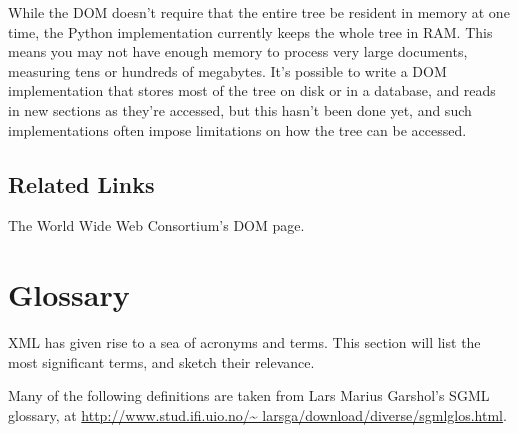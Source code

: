 \documentclass{howto}
\begin{document}
While the DOM doesn't require that the entire tree be resident in
memory at one time, the Python implementation currently keeps the
whole tree in RAM.  This means you may not have enough memory to
process very large documents, measuring tens or hundreds of megabytes.
It's possible to write a DOM implementation that stores most of the
tree on disk or in a database, and reads in new sections as they're
accessed, but this hasn't been done yet, and such implementations
often impose limitations on how the tree can be accessed.


\subsection{Related Links}

\begin{definitions}
%
The World Wide Web Consortium's DOM page.

\end{definitions}

\section{Glossary}

XML has given
rise to a sea of acronyms and terms.  This section will list the most
significant terms, and sketch their relevance.

Many of the following definitions are taken from Lars Marius Garshol's
SGML glossary, at \url{http://www.stud.ifi.uio.no/\~ larsga/download/diverse/sgmlglos.html}.
\end{document}
